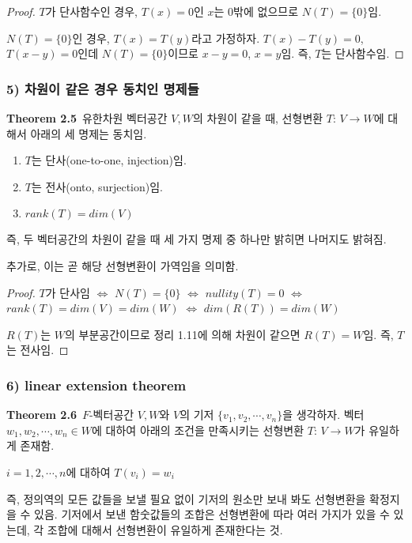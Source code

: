 \documentclass[10pt, a4paper]{article}
\begin{document}
\begin{proof}
$T$가 단사함수인 경우, $T(x)=0$인 $x$는 0밖에 없으므로 $N(T)=\{0\}$임.

$N(T)=\{0\}$인 경우, $T(x)=T(y)$라고 가정하자. $T(x)-T(y)=0$, $T(x-y)=0$인데 $N(T)=\{0\}$이므로 $x-y=0$, $x=y$임. 즉, $T$는 단사함수임.
\end{proof}

\subsubsection*{5) 차원이 같은 경우 동치인 명제들}
\textbf{Theorem 2.5}\, 유한차원 벡터공간 $V,W$의 차원이 같을 때, 선형변환 $T:\,V \rightarrow W$에 대해서 아래의 세 명제는 동치임.

\begin{enumerate}
    \item $T$는 단사(one-to-one, injection)임.
    \item $T$는 전사(onto, surjection)임.
    \item $rank(T)=dim(V)$
\end{enumerate}

즉, 두 벡터공간의 차원이 같을 때 세 가지 명제 중 하나만 밝히면 나머지도 밝혀짐.

추가로, 이는 곧 해당 선형변환이 가역임을 의미함.

\begin{proof}
$T$가 단사임 $\Leftrightarrow$ $N(T)=\{0\}$ $\Leftrightarrow$ $nullity(T)=0$ $\Leftrightarrow$ $rank(T)=dim(V)=dim(W)$ $\Leftrightarrow$ $dim(R(T))=dim(W)$

$R(T)$는 $W$의 부분공간이므로 정리 1.11에 의해 차원이 같으면 $R(T)=W$임. 즉, $T$는 전사임.
\end{proof}


\newpage


\subsubsection*{6) linear extension theorem}
\textbf{Theorem 2.6}\, $F$-벡터공간 $V,W$와 $V$의 기저 $\{v_1,v_2, \cdots ,v_n\}$을 생각하자. 벡터 $w_1,w_2, \cdots ,w_n \in W$에 대하여 아래의 조건을 만족시키는 선형변환 $T:\,V \rightarrow W$가 유일하게 존재함.\\

\begin{center}
$i=1,2, \cdots ,n$에 대하여 $T(v_i)=w_i$
\end{center}

즉, 정의역의 모든 값들을 보낼 필요 없이 기저의 원소만 보내 봐도 선형변환을 확정지을 수 있음. 기저에서 보낸 함숫값들의 조합은 선형변환에 따라 여러 가지가 있을 수 있는데, 각 조합에 대해서 선형변환이 유일하게 존재한다는 것.
\end{document}
